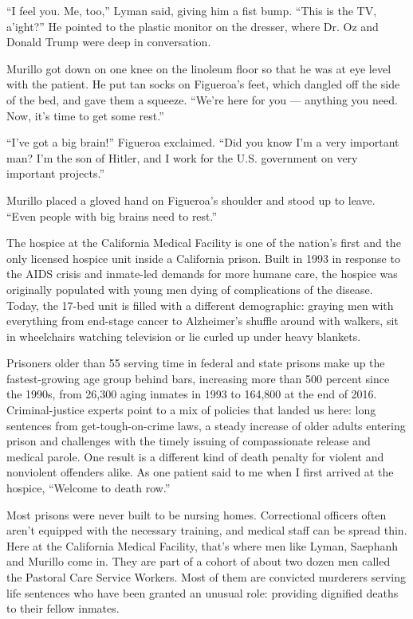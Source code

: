 ``I feel you. Me, too,'' Lyman said, giving him a fist bump. ``This is
the TV, a'ight?'' He pointed to the plastic monitor on the dresser,
where Dr. Oz and Donald Trump were deep in conversation.

Murillo got down on one knee on the linoleum floor so that he was at eye
level with the patient. He put tan socks on Figueroa's feet, which
dangled off the side of the bed, and gave them a squeeze. ``We're here
for you --- anything you need. Now, it's time to get some rest.''

``I've got a big brain!'' Figueroa exclaimed. ``Did you know I'm a very
important man? I'm the son of Hitler, and I work for the U.S. government
on very important projects.''

Murillo placed a gloved hand on Figueroa's shoulder and stood up to
leave. ``Even people with big brains need to rest.''

The hospice at the California Medical Facility is one of the nation's
first and the only licensed hospice unit inside a California prison.
Built in 1993 in response to the AIDS crisis and inmate-led demands for
more humane care, the hospice was originally populated with young men
dying of complications of the disease. Today, the 17-bed unit is filled
with a different demographic: graying men with everything from end-stage
cancer to Alzheimer's shuffle around with walkers, sit in wheelchairs
watching television or lie curled up under heavy blankets.

Prisoners older than 55 serving time in federal and state prisons make
up the fastest-growing age group behind bars, increasing more than 500
percent since the 1990s, from 26,300 aging inmates in 1993 to 164,800 at
the end of 2016. Criminal-justice experts point to a mix of policies
that landed us here: long sentences from get-tough-on-crime laws, a
steady increase of older adults entering prison and challenges with the
timely issuing of compassionate release and medical parole. One result
is a different kind of death penalty for violent and nonviolent
offenders alike. As one patient said to me when I first arrived at the
hospice, ``Welcome to death row.''

Most prisons were never built to be nursing homes. Correctional officers
often aren't equipped with the necessary training, and medical staff can
be spread thin. Here at the California Medical Facility, that's where
men like Lyman, Saephanh and Murillo come in. They are part of a cohort
of about two dozen men called the Pastoral Care Service Workers. Most of
them are convicted murderers serving life sentences who have been
granted an unusual role: providing dignified deaths to their fellow
inmates.

